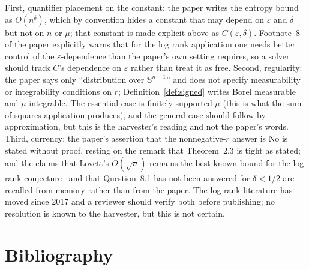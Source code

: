 \documentclass{aicr-conjecture}
\newcommand{\Sph}{\mathbb{S}^{n-1}}
\newcommand{\Ot}{\tilde{O}}
\begin{document}
\begin{remark}\label{rem:reading}
First, quantifier placement on the constant: the paper writes the
entropy bound as $O(n^{\delta})$, which by convention hides a constant
that may depend on $\varepsilon$ and $\delta$ but not on $n$ or $\mu$;
that constant is made explicit above as $C(\varepsilon, \delta)$.
Footnote~8 of the paper explicitly warns that for the log rank
application one needs better control of the $\varepsilon$-dependence
than the paper's own setting requires, so a solver should track $C$'s
dependence on $\varepsilon$ rather than treat it as free. Second,
regularity: the paper says only ``distribution over $\Sph$'' and does
not specify measurability or integrability conditions on $r$;
Definition~\ref{def:signed} writes Borel measurable and
$\mu$-integrable. The essential case is finitely supported $\mu$
(this is what the sum-of-squares application produces), and the
general case should follow by approximation, but this is the
harvester's reading and not the paper's words. Third, currency: the
paper's assertion that the nonnegative-$r$ answer is No is stated
without proof, resting on the remark that Theorem~2.3 is tight as
stated; and the claims that Lovett's $\Ot(\sqrt{n})$ remains the best
known bound for the log rank conjecture~\cite{Lov14} and that
Question~8.1 has not been answered for $\delta < 1/2$ are recalled
from memory rather than from the paper. The log rank literature has
moved since 2017 and a reviewer should verify both before publishing;
no resolution is known to the harvester, but this is not certain.
\end{remark}

\section{Bibliography}
\end{document}
